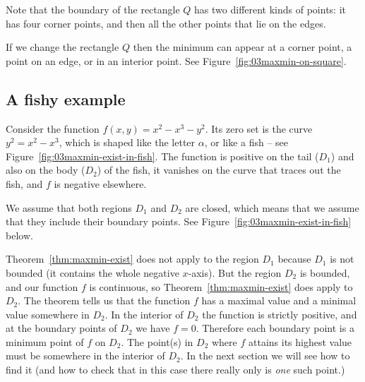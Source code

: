 Note that the boundary of the rectangle $Q$ has two different kinds of points:
it has four corner points, and then all the other points that lie on the edges.

If we change the rectangle $Q$ then the minimum can appear at a corner point, a
point on an edge, or in an interior point.  See
Figure~\ref{fig:03maxmin-on-square}.



\subsection{A fishy example}

\label{sec:cubic-maxmin-exist} 
Consider the function $f(x, y) = x^2-x^3-y^2$.  Its zero set is the curve $y^2 =
x^2-x^3$, which is shaped like the letter $\alpha$, or like a fish -- see
Figure~\ref{fig:03maxmin-exist-in-fish}.  The function is positive on the tail
($D_1$) and also on the body ($D_2$) of the fish, it vanishes on the curve that
traces out the fish, and $f$ is negative elsewhere.

We assume that both regions $D_1$ and $D_2$ are closed, which means that we
assume that they include their boundary points. See
Figure~\ref{fig:03maxmin-exist-in-fish} below.

Theorem~\ref{thm:maxmin-exist} does not apply to the region $D_1$ because $D_1$
is not bounded (it contains the whole negative $x$-axis).  But the region $D_2$
is bounded, and our function $f$ is continuous, so
Theorem~\ref{thm:maxmin-exist} does apply to $D_2$.  The theorem tells us that
the function $f$ has a maximal value and a minimal value somewhere in $D_2$.  In
the interior of $D_2$ the function is strictly positive, and at the boundary
points of $D_2$ we have $f=0$.  Therefore each boundary point is a minimum point
of $f$ on $D_2$.  The point(s) in $D_2$ where $f$ attains its highest value must
be somewhere in the interior of $D_2$.  In the next section we will see how to
find it (and how to check that in this case there really only is \emph{one} such
point.)

